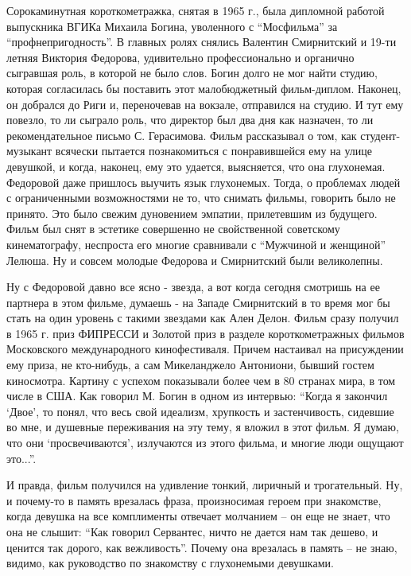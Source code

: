 
Сорокаминутная короткометражка, снятая в 1965 г., была дипломной работой
выпускника ВГИКа Михаила Богина, уволенного с \enquote{Мосфильма} за
\enquote{профнепригодность}. В главных ролях снялись Валентин Смирнитский и 19-ти
летняя Виктория Федорова, удивительно профессионально и органично сыгравшая
роль, в которой не было слов. Богин долго не мог найти студию, которая
согласилась бы поставить этот малобюджетный фильм-диплом. Наконец, он добрался
до Риги и, переночевав на вокзале, отправился на студию. И тут ему повезло, то
ли сыграло роль, что директор был два дня как назначен, то ли рекомендательное
письмо С. Герасимова. Фильм рассказывал о том, как студент-музыкант всячески
пытается познакомиться с понравившейся ему на улице девушкой, и когда, наконец,
ему это удается, выясняется, что она глухонемая. Федоровой даже пришлось
выучить язык глухонемых. Тогда, о проблемах людей с ограниченными возможностями
не то, что снимать фильмы, говорить было не принято. Это было свежим дуновением
эмпатии, прилетевшим из будущего. Фильм был снят в эстетике совершенно не
свойственной советскому кинематографу, неспроста его многие сравнивали с
\enquote{Мужчиной и женщиной} Лелюша. Ну и совсем молодые Федорова и Смирнитский были
великолепны. 

Ну с Федоровой давно все ясно - звезда, а вот когда сегодня смотришь на ее
партнера в этом фильме, думаешь - на Западе Смирнитский в то время мог бы стать
на один уровень с такими звездами как Ален Делон. Фильм сразу получил в 1965 г.
приз ФИПРЕССИ и Золотой приз в разделе короткометражных фильмов Московского
международного кинофестиваля. Причем настаивал на присуждении ему приза, не
кто-нибудь, а сам Микеланджело Антониони, бывший гостем киносмотра. Картину с
успехом показывали более чем в 80 странах мира, в том числе в США. Как говорил
М. Богин в одном из интервью: \enquote{Когда я закончил \enquote{Двое}, то
понял, что весь свой идеализм, хрупкость и застенчивость, сидевшие во мне, и
душевные переживания на эту тему, я вложил в этот фильм. Я думаю, что они
\enquote{просвечиваются}, излучаются из этого фильма, и многие люди ощущают
это...}.

И правда, фильм получился на удивление тонкий, лиричный и трогательный. Ну, и
почему-то в память врезалась фраза, произносимая героем при знакомстве, когда
девушка на все комплименты отвечает молчанием – он еще не знает, что она не
слышит: \enquote{Как говорил Сервантес, ничто не дается нам так дешево, и ценится так
дорого, как вежливость}. Почему она врезалась в память – не знаю, видимо, как
руководство по знакомству с глухонемыми девушками.

